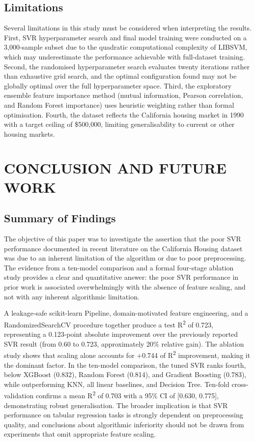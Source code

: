 \documentclass[pdflatex,sn-mathphys-num]{sn-jnl}
\begin{document}
\subsection{Limitations}
Several limitations in this study must be considered when interpreting the results. First, SVR hyperparameter search and final model training were conducted on a 3,000-sample subset due to the quadratic computational complexity of LIBSVM, which may underestimate the performance achievable with full-dataset training. Second, the randomised hyperparameter search evaluates twenty iterations rather than exhaustive grid search, and the optimal configuration found may not be globally optimal over the full hyperparameter space. Third, the exploratory ensemble feature importance method (mutual information, Pearson correlation, and Random Forest importance) uses heuristic weighting rather than formal optimisation. Fourth, the dataset reflects the California housing market in 1990 with a target ceiling of \$500,000, limiting generalisability to current or other housing markets.


\section{CONCLUSION AND FUTURE WORK}
\subsection{Summary of Findings}
The objective of this paper was to investigate the assertion that the poor SVR performance documented in recent literature on the California Housing dataset was due to an inherent limitation of the algorithm or due to poor preprocessing. The evidence from a ten-model comparison and a formal four-stage ablation study provides a clear and quantitative answer: the poor SVR performance in prior work is associated overwhelmingly with the absence of feature scaling, and not with any inherent algorithmic limitation.

A leakage-safe scikit-learn Pipeline, domain-motivated feature engineering, and a RandomizedSearchCV procedure together produce a test R\textsuperscript{2} of 0.723, representing a 0.123-point absolute improvement over the previously reported SVR result (from 0.60 to 0.723, approximately 20\% relative gain). The ablation study shows that scaling alone accounts for +0.744 of R\textsuperscript{2} improvement, making it the dominant factor. In the ten-model comparison, the tuned SVR ranks fourth, below XGBoost (0.832), Random Forest (0.814), and Gradient Boosting (0.783), while outperforming KNN, all linear baselines, and Decision Tree. Ten-fold cross-validation confirms a mean R\textsuperscript{2} of 0.703 with a 95\% CI of [0.630, 0.775], demonstrating robust generalisation. The broader implication is that SVR performance on tabular regression tasks is strongly dependent on preprocessing quality, and conclusions about algorithmic inferiority should not be drawn from experiments that omit appropriate feature scaling.
\end{document}
